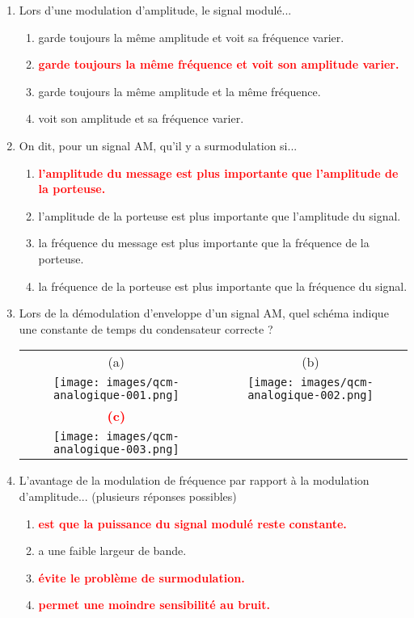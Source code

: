 \documentclass[a4paper]{article}
\begin{document}
\begin{enumerate}[label=Q\arabic*.]


\item Lors d'une modulation d'amplitude, le signal modulé...
\begin{enumerate}
    \item garde toujours la même amplitude et voit sa fréquence varier.
    \item \textcolor{red}{\textbf{garde toujours la même fréquence et voit son amplitude varier.}}
    \item garde toujours la même amplitude et la même fréquence.
    \item voit son amplitude et sa fréquence varier.
\end{enumerate}


\item On dit, pour un signal AM, qu'il y a surmodulation si...
\begin{enumerate}
    \item \textcolor{red}{\textbf{l'amplitude du message est plus importante que l'amplitude de la porteuse.}}
    \item l'amplitude de la porteuse est plus importante que l'amplitude du signal.
    \item la fréquence du message est plus importante que la fréquence de la porteuse.
    \item la fréquence de la porteuse est plus importante que la fréquence du signal.
\end{enumerate}


\item Lors de la démodulation d'enveloppe d'un signal AM, quel schéma indique une constante de temps du condensateur correcte ?
\begin{center} \begin{tabular}{cc}
    (a) & (b) \\
    \texttt{[image: images/qcm-analogique-001.png]} &
    \texttt{[image: images/qcm-analogique-002.png]} \\
    \textcolor{red}{\textbf{(c)}} & \\
    \texttt{[image: images/qcm-analogique-003.png]} &
\end{tabular} \end{center}


\item L'avantage de la modulation de fréquence par rapport à la modulation d'amplitude... (plusieurs réponses possibles)
\begin{enumerate}
    \item \textcolor{red}{\textbf{est que la puissance du signal modulé reste constante.}}
    \item a une faible largeur de bande.
    \item \textcolor{red}{\textbf{évite le problème de surmodulation.}}
    \item \textcolor{red}{\textbf{permet une moindre sensibilité au bruit.}}
\end{enumerate}



\end{enumerate}
\end{document}
